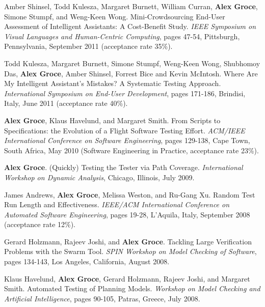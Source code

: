 \documentclass[ComputerScience]{vita}
\begin{document}
\begin{vita}
\begin{Refereed Conference and Workshop Publications}
\item
Amber Shinsel, Todd Kulesza, Margaret Burnett, William Curran, {\bf Alex Groce}, Simone Stumpf, and Weng-Keen Wong.
\newblock Mini-Crowdsourcing End-User Assessment of Intelligent Assistants: A Cost-Benefit Study.
\newblock \emph{IEEE Symposium on Visual Languages and Human-Centric Computing}, pages 47-54, Pittsburgh, Pennsylvania, September 2011 (acceptance rate 35\%).

\item
Todd Kulesza, Margaret Burnett, Simone Stumpf, Weng-Keen Wong, Shubhomoy Das, {\bf Alex Groce}, Amber Shinsel, Forrest Bice and Kevin McIntosh.
\newblock Where Are My Intelligent Assistant's Mistakes?  A Systematic Testing Approach.
\newblock \emph{International Symposium on End-User Development}, pages 171-186, Brindisi, Italy, June 2011 (acceptance rate 40\%).

\item
{\bf Alex Groce}, Klaus Havelund, and Margaret Smith.
\newblock From Scripts to Specifications: the Evolution of a Flight Software Testing Effort.
\newblock \emph{ACM/IEEE International Conference on Software Engineering}, pages 129-138, Cape Town, South Africa, May 2010 (Software Engineering in Practice, acceptance rate 23\%). 

\item
{\bf Alex Groce}.
\newblock (Quickly) Testing the Tester via Path Coverage.
\newblock \emph{International Workshop on Dynamic Analysis}, Chicago, Illinois, July 2009.

\item
James Andrews, {\bf Alex Groce}, Melissa Weston, and Ru-Gang Xu.
\newblock Random Test Run Length and Effectiveness.
\newblock \emph{IEEE/ACM International Conference on Automated Software Engineering}, pages 19-28, L'Aquila, Italy, September 2008 (acceptance rate 12\%).

\item
Gerard Holzmann, Rajeev Joshi, and {\bf Alex Groce}.
\newblock Tackling Large Verification Problems with the Swarm Tool.
\newblock \emph{SPIN Workshop on Model Checking of Software}, pages 134-143, Los Angeles, California, August 2008.

\item
Klaus Havelund, {\bf Alex Groce}, Gerard Holzmann, Rajeev Joshi, and Margaret Smith.
\newblock Automated Testing of Planning Models.
\newblock \emph{Workshop on Model Checking and Artificial Intelligence}, pages 90-105, Patras, Greece, July 2008.


\end{Refereed Conference and Workshop Publications}
\end{vita}
\end{document}
